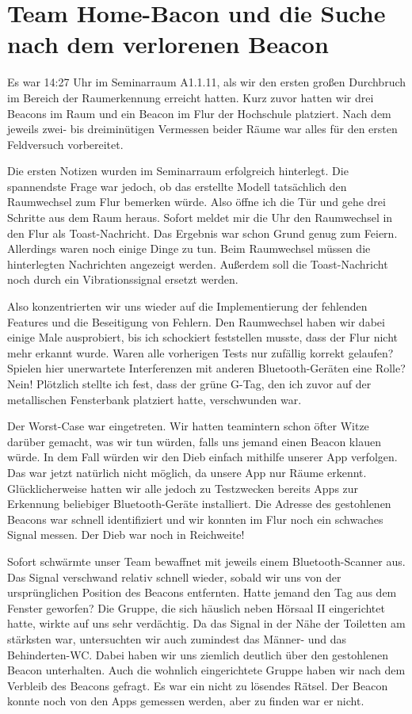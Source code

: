 \section{Team Home-Bacon und die Suche nach dem verlorenen Beacon}

Es war 14:27 Uhr im Seminarraum A1.1.11, als wir den ersten großen Durchbruch
im Bereich der Raumerkennung erreicht hatten. Kurz zuvor hatten wir drei Beacons
im Raum und ein Beacon im Flur der Hochschule platziert. Nach dem jeweils
zwei- bis dreiminütigen Vermessen beider Räume war alles für den ersten
Feldversuch vorbereitet.

Die ersten Notizen wurden im Seminarraum erfolgreich hinterlegt. Die spannendste
Frage war jedoch, ob das erstellte Modell tatsächlich den Raumwechsel zum Flur 
bemerken würde. Also öffne ich die Tür und gehe drei Schritte aus dem Raum heraus.
Sofort meldet mir die Uhr den Raumwechsel in den Flur als Toast-Nachricht. Das 
Ergebnis war schon Grund genug zum Feiern. Allerdings waren noch einige Dinge
zu tun. Beim Raumwechsel müssen die hinterlegten Nachrichten angezeigt werden.
Außerdem soll die Toast-Nachricht noch durch ein Vibrationssignal ersetzt werden.

Also konzentrierten wir uns wieder auf die Implementierung der fehlenden
Features und die Beseitigung von Fehlern. Den Raumwechsel haben wir dabei einige
Male ausprobiert, bis ich schockiert feststellen musste, dass der Flur nicht
mehr erkannt wurde. Waren alle vorherigen Tests nur zufällig korrekt gelaufen?
Spielen hier unerwartete Interferenzen mit anderen Bluetooth-Geräten eine Rolle?
Nein! Plötzlich stellte ich fest, dass der grüne G-Tag, den ich zuvor auf der
metallischen Fensterbank platziert hatte, verschwunden war.

Der Worst-Case war eingetreten. Wir hatten teamintern schon öfter Witze darüber
gemacht, was wir tun würden, falls uns jemand einen Beacon klauen würde.
In dem Fall würden wir den Dieb einfach mithilfe unserer App verfolgen.
Das war jetzt natürlich nicht möglich, da unsere App nur Räume erkennt.
Glücklicherweise hatten wir alle jedoch zu Testzwecken bereits Apps zur Erkennung
beliebiger Bluetooth-Geräte installiert. Die Adresse des gestohlenen Beacons
war schnell identifiziert und wir konnten im Flur noch ein schwaches Signal
messen. Der Dieb war noch in Reichweite!

Sofort schwärmte unser Team bewaffnet mit jeweils einem Bluetooth-Scanner aus.
Das Signal verschwand relativ schnell wieder, sobald wir uns von der ursprünglichen
Position des Beacons entfernten. Hatte jemand den Tag aus dem Fenster geworfen?
Die Gruppe, die sich häuslich neben Hörsaal II eingerichtet hatte, wirkte auf uns
sehr verdächtig. Da das Signal in der Nähe der Toiletten am stärksten war,
untersuchten wir auch zumindest das Männer- und das Behinderten-WC. Dabei haben wir
uns ziemlich deutlich über den gestohlenen Beacon unterhalten. Auch die
wohnlich eingerichtete Gruppe haben wir nach dem Verbleib des Beacons gefragt.
Es war ein nicht zu lösendes Rätsel. Der Beacon konnte noch von den Apps gemessen
werden, aber zu finden war er nicht.

